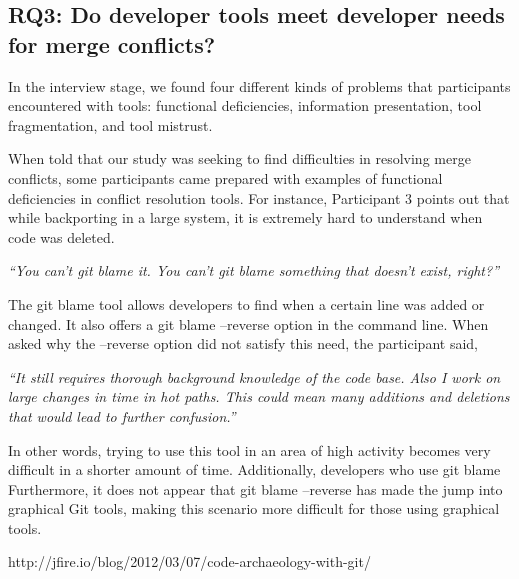 \subsection{\textbf{RQ3:} Do developer tools meet developer needs for merge conflicts?}\label{RQ3}

In the interview stage, we found four different kinds of problems that participants encountered with tools: functional deficiencies, information presentation, tool fragmentation, and tool mistrust. 


When told that our study was seeking to find difficulties in resolving merge conflicts, some participants came prepared with examples of functional deficiencies in conflict resolution tools. For instance, Participant 3 points out that while backporting in a large system, it is extremely hard to understand when code was deleted. 

\begin{displayquote}
\textit{``You can't git blame it. You can't git blame something that doesn't exist, right?''}
\end{displayquote}

The git blame tool allows developers to find when a certain line was added or changed. It also offers a git blame --reverse option in the command line. When asked why the --reverse option did not satisfy this need, the participant said, 

\begin{displayquote}
\textit{``It still requires thorough background knowledge of the code base. Also I work on large changes in time in hot paths. This could mean many additions and deletions that would lead to further confusion.''}
\end{displayquote}

 In other words, trying to use this tool in an area of high activity becomes very difficult in a shorter amount of time. Additionally, developers who use git blame Furthermore, it does not appear that git blame --reverse has made the jump into graphical Git tools, making this scenario more difficult for those using graphical tools.


http://jfire.io/blog/2012/03/07/code-archaeology-with-git/


